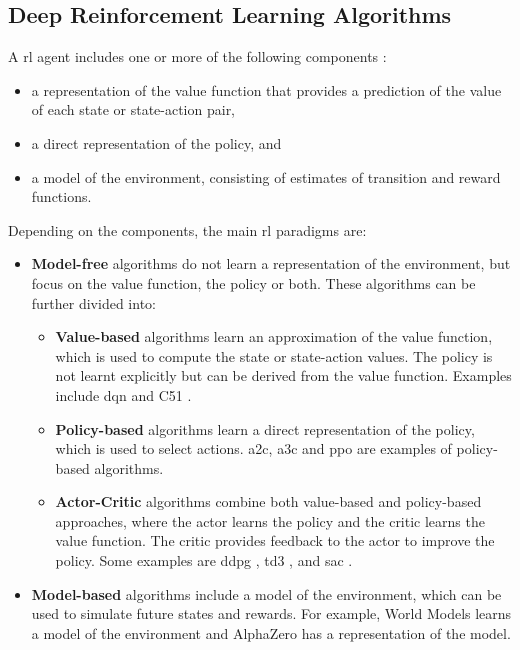 \subsection{Deep Reinforcement Learning Algorithms} \label{sec:drlalgorithms}

A \acrfull{rl} agent includes one or more of the following components \cite{Francois-Lavet2018}:
\begin{itemize}
    \item a representation of the value function that provides a prediction of the value of each state or state-action pair,
    \item a direct representation of the policy, and
    \item a model of the environment, consisting of estimates of transition and reward functions.
\end{itemize}

Depending on the components, the main \acrshort{rl} paradigms are: 
\begin{itemize}
    \item \textbf{Model-free} algorithms do not learn a representation of the environment, but focus on the value function, the policy or both. These algorithms can be further divided into:
    \begin{itemize}
        \item \textbf{Value-based} algorithms learn an approximation of the value function, which is used to compute the state or state-action values. The policy is not learnt explicitly but can be derived from the value function. Examples include \acrfull{dqn} \cite{Mnih2013} and C51 \cite{Bellemare2017}. 
        \item \textbf{Policy-based} algorithms learn a direct representation of the policy, which is used to select actions. \acrfull{a2c}, \acrfull{a3c} \cite{Mnih2016} and \acrfull{ppo} \cite{Schulman2017} are examples of policy-based algorithms.
        \item \textbf{Actor-Critic} algorithms combine both value-based and policy-based approaches, where the actor learns the policy and the critic learns the value function. The critic provides feedback to the actor to improve the policy. Some examples are \acrfull{ddpg} \cite{Lillicrap2015}, \acrfull{td3} \cite{Fujimoto2018}, and \acrfull{sac} \cite{Haarnoja2018}.
    \end{itemize}
    \item \textbf{Model-based} algorithms include a model of the environment, which can be used to simulate future states and rewards. For example, World Models \cite{HaGoogleBrainTokyo2018} learns a model of the environment and AlphaZero \cite{Silver2017} has a representation of the model. 
\end{itemize}

